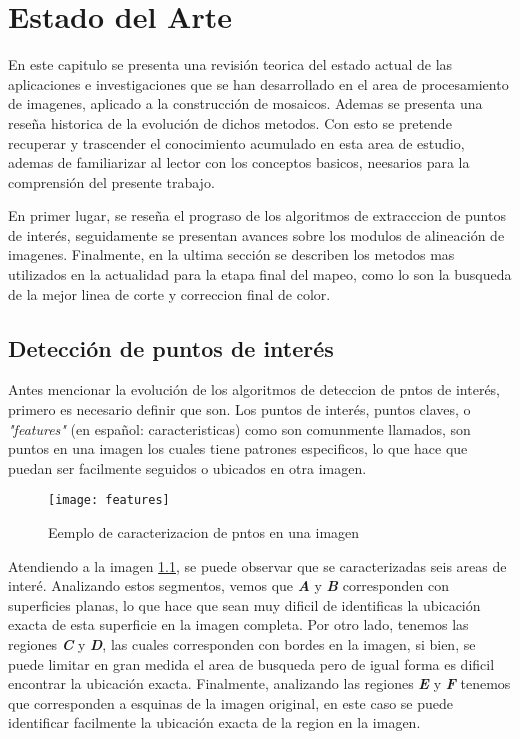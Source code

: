 \chapter{Estado del Arte}
\label{capitulo2}

En este capitulo se presenta una revisión teorica del estado actual de las aplicaciones e investigaciones que se han desarrollado en el area de procesamiento de imagenes, aplicado a la construcción de mosaicos. Ademas se presenta una reseña historica de la evolución de dichos metodos. Con esto se pretende recuperar y trascender el conocimiento acumulado en esta area de estudio, ademas de familiarizar al lector con los conceptos basicos, neesarios para la comprensión del presente trabajo.

En primer lugar, se reseña el prograso de los algoritmos de extracccion de puntos de interés, seguidamente se presentan avances sobre los modulos de alineación de imagenes. Finalmente, en la ultima sección se describen los metodos mas utilizados en la actualidad para la etapa final del mapeo, como lo son la busqueda de la mejor linea de corte y correccion final de color.

\section{Detección de puntos de interés}

Antes mencionar la evolución de los algoritmos de deteccion de pntos de interés, primero es necesario definir que son. Los puntos de interés, puntos claves, o \textit{"features"} (en español: caracteristicas) como son comunmente llamados, son puntos en una imagen los cuales tiene patrones especificos, lo que hace que puedan ser facilmente seguidos o ubicados en otra imagen.

\begin{figure}[H]
	\centering
	\texttt{[image: features]}
	\caption[Puntos de interés]{Eemplo de caracterizacion de pntos en una imagen}
	\label{imagen:features}
\end{figure}

Atendiendo a la imagen \ref{imagen:features}, se puede observar que se caracterizadas seis areas de interé. Analizando estos segmentos, vemos que \textbf{\textit{A}} y \textbf{\textit{B}} corresponden con superficies planas, lo que hace que sean muy dificil de identificas la ubicación exacta de esta superficie en la imagen completa. Por otro lado, tenemos las regiones \textbf{\textit{C}} y \textbf{\textit{D}}, las cuales corresponden con bordes en la imagen, si bien, se puede limitar en gran medida el area de busqueda pero de igual forma es dificil encontrar la ubicación exacta. Finalmente, analizando las regiones \textbf{\textit{E}} y \textbf{\textit{F}} tenemos que corresponden a esquinas de la imagen original, en este caso se puede identificar facilmente la ubicación exacta de la region en la imagen.

